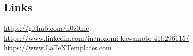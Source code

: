 \documentclass[11pt]{article} %
\begin{document}
\begin{paracol}{2}
\section{Links}
{\faGithub} \hspace{1mm} \href{https://github.com/n0z0me}{https://github.com/n0z0me} \\ %
{\faLinkedinSquare} \hspace{1mm} \href{https://www.linkedin.com/in/nozomi-kawamoto-41b296115/}{https://www.linkedin.com/in/nozomi-kawamoto-41b296115/} \\ %
{\small\faDesktop} \hspace{1mm} \href{https://www.LaTeXTemplates.com}{https://www.LaTeXTemplates.com} \\ %

\end{paracol}

\end{document}
